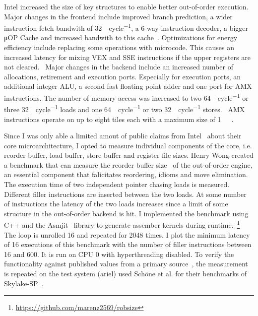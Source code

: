 Intel increased the size of key structures to enable better out-of-order execution.
Major changes in the frontend include improved branch prediction, a wider instruction fetch bandwith of \SI{32}{\byte\per cycle}, a 6-way instruction decoder, a bigger μOP Cache and increased bandwith to this cache~\cite[Sec. 2.4]{Intel_Optimization_Reference_Manual_050}.
Optimizations for energy efficiency include replacing some operations with microcode.
This causes an increased latency for mixing VEX and SSE instructions if the upper registers are not cleared.~\cite[Sec. 3.11.6]{Intel_Optimization_Reference_Manual_050}
Major changes in the backend include an increased number of allocations, retirement and execution ports.
Especially for execution ports, an additional integer ALU, a second fast floating point adder and one port for AMX instructions.
The number of memory access was increased to two \SI{64}{\byte\per cycle} or three \SI{32}{\byte\per cycle} loads and one \SI{64}{\byte\per cycle} or two \SI{32}{\byte\per cycle} stores.~\cite[Sec. 2.4]{Intel_Optimization_Reference_Manual_050}
AMX instructions operate on up to eight tiles each with a maximum size of \SI{1}{\kibi\byte}~\cite[Sec. 20.5.2]{Intel_Optimization_Reference_Manual_050}.

Since I was only able a limited amout of public claims from Intel~\cite{Intel_2021_Architecture_Day} about their core microarchitecture, I opted to measure individual components of the core, i.e. reorder buffer, load buffer, store buffer and register file sizes.
Henry Wong created a benchmark that can measure the reorder buffer size~\cite{Wong_2013_robsize} of the out-of-order engine, an essential component that falicitates reordering, idioms and move elimination.
The execution time of two independent pointer chasing loads is measured.
Different filler instructions are inserted between the two loads.
At some number of instructions the latency of the two loads increases since a limit of some structure in the out-of-order backend is hit.
I implemented the benchmark using C++ and the Asmjit~\cite{Kobalicek_AsmJit} library to generate assember kernels during runtime.~\footnote{\url{https://github.com/marenz2569/robsize}}
The loop is unrolled \SI{16}{} and repeated for \SI{2048}{} times.
I plot the minimum latency of \SI{16}{} executions of this benchmark with the number of filler instructions between \SI{16}{} and \SI{600}{}.
It is run on CPU 0 with hyperthreading disabled.
To verify the functionality against published values from a primary source~\cite{Intel_2017_Skylake_SP}, the measurement is repeated on the test system (ariel) used Schöne et al. for their benchmarks of Skylake-SP~\cite{Schoene_2019_SKL}.


